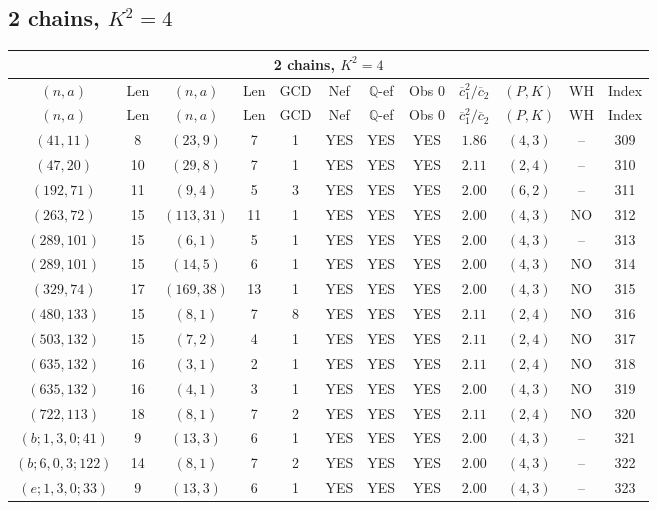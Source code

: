 \subsection{2 chains, $K^2 = 4$}
\begin{longtable}{|c|c|c|c|c|c|c|c|c|c|c|c|}
\hline
\multicolumn{12}{|c|}{2 chains, $K^2 = 4$}\\
\hline
$(n,a)$ & Len & $(n,a)$ & Len & GCD & Nef & $\mathbb Q$-ef & Obs 0 & $\overline c_1^2 / \overline c_2$ & $(P,K)$ & WH & Index\\
\hline
\endfirsthead

\hline
$(n,a)$ & Len & $(n,a)$ & Len & GCD & Nef & $\mathbb Q$-ef & Obs 0 & $\overline c_1^2 / \overline c_2$ & $(P,K)$ & WH & Index\\
\hline
\endhead
\hline
\endfoot

$(41,11)$ & 8 & $(23,9)$ & 7 & 1 & YES & YES & YES & $1.86$ & $(4,3)$ & -- & 309\\
$(47,20)$ & 10 & $(29,8)$ & 7 & 1 & YES & YES & YES & $2.11$ & $(2,4)$ & -- & 310\\
$(192,71)$ & 11 & $(9,4)$ & 5 & 3 & YES & YES & YES & $2.00$ & $(6,2)$ & -- & 311\\
$(263,72)$ & 15 & $(113,31)$ & 11 & 1 & YES & YES & YES & $2.00$ & $(4,3)$ & NO & 312\\
$(289,101)$ & 15 & $(6,1)$ & 5 & 1 & YES & YES & YES & $2.00$ & $(4,3)$ & -- & 313\\
$(289,101)$ & 15 & $(14,5)$ & 6 & 1 & YES & YES & YES & $2.00$ & $(4,3)$ & NO & 314\\
$(329,74)$ & 17 & $(169,38)$ & 13 & 1 & YES & YES & YES & $2.00$ & $(4,3)$ & NO & 315\\
$(480,133)$ & 15 & $(8,1)$ & 7 & 8 & YES & YES & YES & $2.11$ & $(2,4)$ & NO & 316\\
$(503,132)$ & 15 & $(7,2)$ & 4 & 1 & YES & YES & YES & $2.11$ & $(2,4)$ & NO & 317\\
$(635,132)$ & 16 & $(3,1)$ & 2 & 1 & YES & YES & YES & $2.11$ & $(2,4)$ & NO & 318\\
$(635,132)$ & 16 & $(4,1)$ & 3 & 1 & YES & YES & YES & $2.00$ & $(4,3)$ & NO & 319\\
$(722,113)$ & 18 & $(8,1)$ & 7 & 2 & YES & YES & YES & $2.11$ & $(2,4)$ & NO & 320\\
$(b;1,3,0;41)$ & 9 & $(13,3)$ & 6 & 1 & YES & YES & YES & $2.00$ & $(4,3)$ & -- & 321\\
$(b;6,0,3;122)$ & 14 & $(8,1)$ & 7 & 2 & YES & YES & YES & $2.00$ & $(4,3)$ & -- & 322\\
$(e;1,3,0;33)$ & 9 & $(13,3)$ & 6 & 1 & YES & YES & YES & $2.00$ & $(4,3)$ & -- & 323
\end{longtable}
